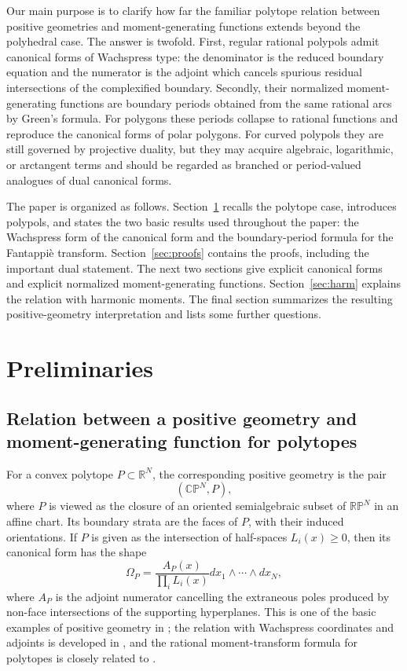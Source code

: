 \documentclass[10pt,a4paper,reqno]{amsart}
\newcommand {\bR} {\mathbb R}
\newcommand {\bCP} {\mathbb {CP}}
\newcommand {\bRP} {\mathbb {RP}}
\theoremstyle{plain}
\theoremstyle{definition}
\begin{document}
 \medskip
 Our main purpose is to clarify how far the familiar polytope relation between
positive geometries and moment-generating functions extends beyond the
polyhedral case.  The answer is twofold.  First, regular rational polypols admit
canonical forms of Wachspress type: the denominator is the reduced boundary
equation and the numerator is the adjoint which cancels spurious residual
intersections of the complexified boundary.  Secondly, their normalized
moment-generating functions are boundary periods obtained from the same rational
arcs by Green's formula.  For polygons these periods collapse to rational
functions and reproduce the canonical forms of polar polygons.  For curved
polypols they are still governed by projective duality, but they may acquire
algebraic, logarithmic, or arctangent terms and should be regarded as branched
or period-valued analogues of dual canonical forms.

 \medskip
 The paper is organized as follows.  Section~\ref{sec:prel} recalls the
polytope case, introduces polypols, and states the two basic results used
throughout the paper: the Wachspress form of the canonical form and the
boundary-period formula for the Fantappi\`e transform.  Section~\ref{sec:proofs}
contains the proofs, including the important dual statement.  The next two
sections give explicit canonical forms and explicit normalized moment-generating
functions.  Section~\ref{sec:harm} explains the relation with harmonic moments.
The final section summarizes the resulting positive-geometry interpretation and
lists some further questions.

\section{Preliminaries}\label{sec:prel} 

\subsection{Relation between a positive geometry and moment-generating function for polytopes} 
For a convex polytope $P\subset \bR^N$, the corresponding positive geometry is the pair
$$
(\bCP^N,P),
$$
where $P$ is viewed as the closure of an oriented semialgebraic subset of $\bRP^N$ in an affine chart.  Its boundary strata are the faces of $P$, with their induced orientations.  If $P$ is given as the intersection of half-spaces $L_i(x)\geq 0$, then its canonical form has the shape
$$
\Omega_P=\frac{A_P(x)}{\prod_i L_i(x)}dx_1\wedge\cdots\wedge dx_N,
$$
where $A_P$ is the adjoint numerator cancelling the extraneous poles produced by non-face intersections of the supporting hyperplanes.  This is one of the basic examples of positive geometry in \cite{AHBL}; the relation with Wachspress coordinates and adjoints is developed in \cite{Wa,Wa75,Warren,KoRa,GaetzAdjoints}, and the rational moment-transform formula for polytopes is closely related to \cite{GrPaShSh}.
\end{document}
